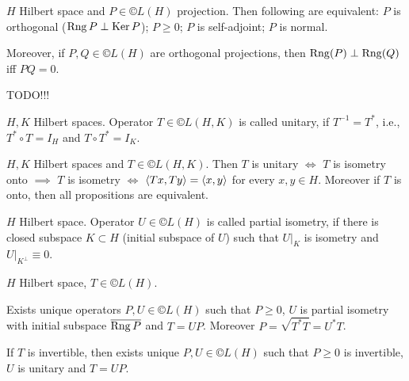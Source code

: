 \documentclass[12pt]{article}					%
\begin{document}
\begin{veta}
	$H$ Hilbert space and $P \in ©L(H)$ projection. Then following are equivalent: $P$ is orthogonal ($\operatorname{Rng} P \perp \operatorname{Ker} P$); $P ≥ 0$; $P$ is self-adjoint; $P$ is normal.

	Moreover, if $P, Q \in ©L(H)$ are orthogonal projections, then $\operatorname{Rng}(P) \perp \operatorname{Rng}(Q)$ iff $PQ = 0$.

	\begin{dukazin}
		TODO!!!
	\end{dukazin}
\end{veta}

\begin{definice}
	$H, K$ Hilbert spaces. Operator $T \in ©L(H, K)$ is called unitary, if $T^{-1} = T^*$, i.e., $T^*∘T = I_H$ and $T∘T^* = I_K$.
\end{definice}

\begin{tvrzeni}
	$H, K$ Hilbert spaces and $T \in ©L(H, K)$. Then $T$ is unitary $\Leftrightarrow$ $T$ is isometry onto $\implies$ $T$ is isometry $\Leftrightarrow$ $\left\langle Tx, Ty\right\rangle = \left\langle x, y\right\rangle$ for every $x, y \in H$. Moreover if $T$ is onto, then all propositions are equivalent.

	\begin{dukazin}
	\end{dukazin}
\end{tvrzeni}

\begin{definice}
	$H$ Hilbert space. Operator $U \in ©L(H)$ is called partial isometry, if there is closed subspace $K \subset H$ (initial subspace of $U$) such that $U|_K$ is isometry and $U|_{K^\perp} ≡ 0$.
\end{definice}

\begin{veta}
	$H$ Hilbert space, $T \in ©L(H)$.

	Exists unique operators $P, U \in ©L(H)$ such that $P ≥ 0$, $U$ is partial isometry with initial subspace $\overline{\operatorname{Rng} P}$ and $T = UP$. Moreover $P = \sqrt{T^* T} = U^* T$.

	If $T$ is invertible, then exists unique $P, U \in ©L(H)$ such that $P ≥ 0$ is invertible, $U$ is unitary and $T = UP$.
\end{veta}


\vspace{-2.5em}
\end{document}
